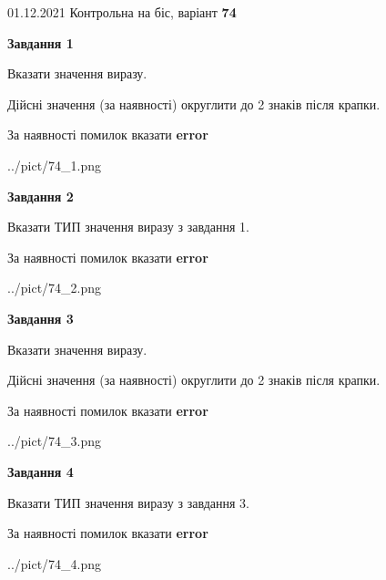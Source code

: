 \documentclass[11pt, ukrainian]{article}
\begin{document}
{01.12.2021 Контрольна на біс, варіант  \No \textbf { 74 }\par}
{
\begin {large}
{\begin {center}\textbf{Завдання 1}\end {center}}\par
Вказати значення виразу. \par
Дійсні значення (за наявності) округлити до 2 знаків після крапки. \par
За наявності помилок вказати \textbf{error}

\begin{center}
	{../pict/74_1.png}
\end{center}
\newpage

{\begin {center}\textbf{Завдання 2}\end {center}}\par
Вказати ТИП значення виразу з завдання 1. \par
За наявності помилок вказати \textbf{error}

\begin{center}
	{../pict/74_2.png}
\end{center}
\newpage

{\begin {center}\textbf{Завдання 3}\end {center}}\par
Вказати значення виразу. \par
Дійсні значення (за наявності) округлити до 2 знаків після крапки. \par
За наявності помилок вказати \textbf{error}

\begin{center}
	{../pict/74_3.png}
\end{center}
\newpage

{\begin {center}\textbf{Завдання 4}\end {center}}\par
Вказати ТИП значення виразу з завдання 3. \par
За наявності помилок вказати \textbf{error}

\begin{center}
	{../pict/74_4.png}
\end{center}
\newpage


\end{large}}
\end{document}
